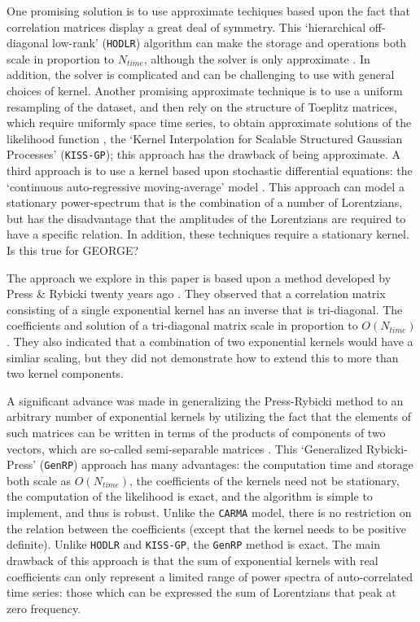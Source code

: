 \documentclass[manuscript, letterpaper]{aastex6}
\begin{document}
One promising solution is to use approximate techiques based upon the fact that correlation
matrices display a great deal of symmetry.  This `hierarchical off-diagonal low-rank' (\texttt{HODLR})
algorithm can make the storage and operations both scale in proportion to $N_{time}$, although the
solver is only approximate \citep{Ambikasaran2013,Ambikasaran2016}.  In addition, the
solver is complicated and can be challenging to use with general choices of kernel.  Another
promising approximate technique is to use a uniform resampling of the dataset, and then
rely on the structure of Toeplitz matrices, which require uniformly space time series,
to obtain approximate solutions of the likelihood function \citep{WilsonNickisch2015},
the `Kernel Interpolation for Scalable Structured Gaussian Processes' (\texttt{KISS-GP});
this approach has the drawback of being approximate.  A third approach is to use a kernel
based upon stochastic differential equations:  the `continuous auto-regressive moving-average'
model \citep[aka \texttt{CARMA};][]{Kelly2014}.  This approach can model a stationary power-spectrum that
is the combination of a number of Lorentzians, but has the disadvantage that the amplitudes
of the Lorentzians are required to have a specific relation.  In addition, these
techniques require a stationary kernel. {\color{red} Is this true for GEORGE?}

The approach we explore in this paper is based upon a method developed by Press \&
Rybicki twenty years ago \citep{1995PhRvL..74.1060R}.  They observed that a correlation
matrix consisting of a single exponential kernel has an inverse that is tri-diagonal.
The coefficients and solution of a tri-diagonal matrix scale in proportion to $O(N_{time})$.
They also indicated that a combination of two exponential kernels would have a simliar scaling,
but they did not demonstrate how to extend this to more than two kernel components.

A significant advance was made in generalizing the Press-Rybicki method to an
arbitrary number of exponential kernels by utilizing the fact that the elements of
such matrices can be written in terms of the products of components of two vectors,
which are so-called semi-separable matrices \citep{Ambikasaran2015}.  This `Generalized
Rybicki-Press' (\texttt{GenRP}) approach
has many advantages:  the computation time and storage both scale as $O(N_{time})$,
the coefficients of the kernels need not be stationary, the computation of the
likelihood is exact, and the algorithm is simple to implement, and thus is robust.
Unlike the \texttt{CARMA} model, there is no restriction on the relation between
the coefficients (except that the kernel needs to be positive definite).  Unlike
\texttt{HODLR} and \texttt{KISS-GP},  the \texttt{GenRP} method is exact.  The main drawback
of this approach is that the sum of exponential kernels with real coefficients can
only represent a limited range of power spectra of auto-correlated time series:
those which can be expressed the sum of Lorentzians that peak at zero frequency.
\end{document}
